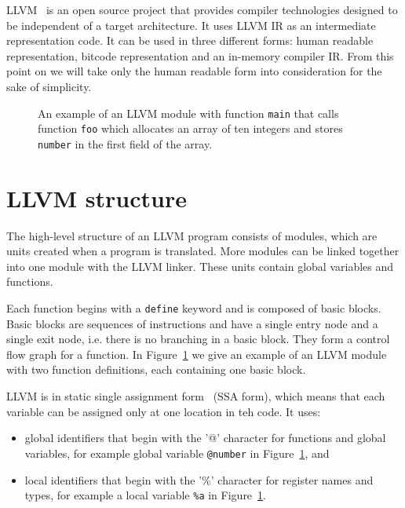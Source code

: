 LLVM~\cite{llvm} is an open source project that provides compiler technologies
designed to be independent of a target architecture. It uses LLVM IR as an
intermediate representation code. It can be used in three different forms:
human readable representation, bitcode representation and an in-memory compiler
IR. From this point on we will take only the human readable form into
consideration for the sake of simplicity.

\begin{figure}[h]
 
 \caption{An example of an LLVM module with function \texttt{main} that calls
 function \texttt{foo} which allocates an array of ten integers and stores
 \texttt{number} in the first field of the array.}
 \label{fig:llvm_example}
\end{figure}

\section{LLVM structure} %

The high-level structure of an LLVM program consists of modules, which are
units created when a program is translated. More modules can be linked together
into one module with the LLVM linker. These units contain global variables and
functions.

Each function begins with a \texttt{define} keyword and is composed of basic
blocks. Basic blocks are sequences of instructions and have a single entry node
and a single exit node, i.e. there is no branching in a basic block. They form
a control flow graph for a function. In Figure~\ref{fig:llvm_example} we give
an example of an LLVM module with two function definitions, each containing one
basic block.

LLVM is in static single assignment form~\cite{ssa} (SSA form), which means that each
variable can be assigned only at one location in teh code. It uses:

\begin{itemize}
    \item global identifiers that begin with the '@' character for functions
    and global variables, for example global variable \texttt{@number} in
    Figure~\ref{fig:llvm_example}, and
    \item local identifiers that begin with the '\%' character for register
    names and types, for example a local variable \texttt{\%a} in
    Figure~\ref{fig:llvm_example}.
\end{itemize}

